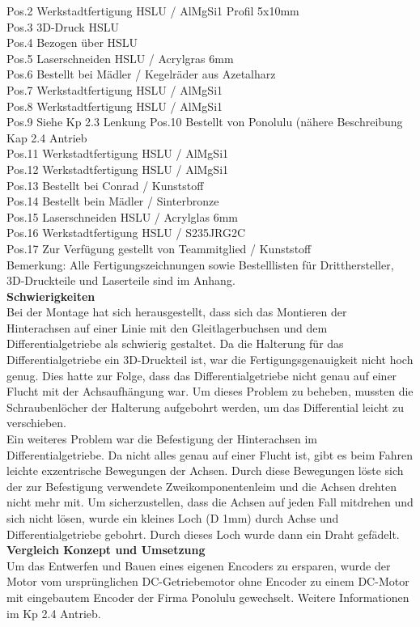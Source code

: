 Pos.2 	Werkstadtfertigung HSLU / AlMgSi1 Profil 5x10mm\\
Pos.3 	3D-Druck HSLU\\
Pos.4 	Bezogen über HSLU\\
Pos.5 	Laserschneiden HSLU / Acrylgras 6mm\\
Pos.6 	Bestellt bei Mädler / Kegelräder aus Azetalharz\\
Pos.7 	Werkstadtfertigung HSLU / AlMgSi1\\
Pos.8	Werkstadtfertigung HSLU / AlMgSi1\\
Pos.9 	Siehe Kp 2.3 Lenkung
Pos.10	Bestellt von Ponolulu (nähere Beschreibung Kap 2.4 Antrieb\\
Pos.11	Werkstadtfertigung HSLU / AlMgSi1\\
Pos.12	Werkstadtfertigung HSLU / AlMgSi1\\
Pos.13	Bestellt bei Conrad / Kunststoff\\
Pos.14	Bestellt bein Mädler / Sinterbronze\\
Pos.15	Laserschneiden HSLU / Acrylglas 6mm\\
Pos.16	Werkstadtfertigung HSLU / S235JRG2C\\
Pos.17	Zur Verfügung gestellt von Teammitglied / Kunststoff\\[0.2cm]
Bemerkung: Alle Fertigungszeichnungen sowie Bestelllisten für Dritthersteller, 3D-Druckteile und Laserteile sind im Anhang.\\
\textbf{Schwierigkeiten}\\[0.2cm]
Bei der Montage hat sich herausgestellt, dass sich das Montieren der Hinterachsen  auf einer Linie mit den Gleitlagerbuchsen und dem Differentialgetriebe  als schwierig gestaltet. Da die Halterung für das Differentialgetriebe ein 3D-Druckteil ist, war die Fertigungsgenauigkeit nicht hoch genug. Dies hatte zur Folge, dass das Differentialgetriebe nicht genau auf einer Flucht mit der Achsaufhängung war. Um dieses Problem zu beheben, mussten die Schraubenlöcher der Halterung aufgebohrt werden, um das Differential leicht zu verschieben.\\
Ein weiteres Problem war die Befestigung der Hinterachsen im Differentialgetriebe. Da nicht alles genau auf einer Flucht ist, gibt es beim Fahren leichte exzentrische Bewegungen der Achsen. Durch diese Bewegungen löste sich der zur Befestigung verwendete Zweikomponentenleim und die Achsen drehten nicht mehr mit. Um sicherzustellen, dass die Achsen auf jeden Fall mitdrehen und sich nicht lösen, wurde ein kleines Loch (D 1mm) durch Achse und Differentialgetriebe gebohrt. Durch dieses Loch wurde dann ein Draht gefädelt.\\[0.2cm] 
\textbf{Vergleich Konzept und Umsetzung}\\[0.2cm]
Um das Entwerfen und Bauen eines eigenen Encoders zu ersparen, wurde der Motor vom ursprünglichen DC-Getriebemotor ohne Encoder zu einem DC-Motor mit eingebautem Encoder der Firma Ponolulu gewechselt. Weitere Informationen im Kp 2.4 Antrieb.
